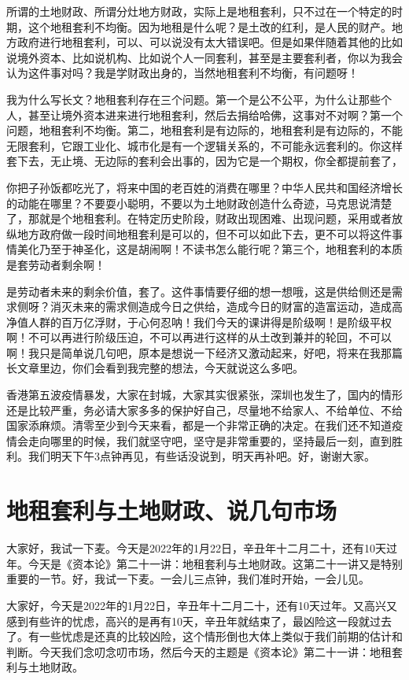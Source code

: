 \documentclass[UTF8, 12pt, a4paper]{ctexrep}
\begin{document}
所谓的土地财政、所谓分灶地方财政，实际上是地租套利，只不过在一个特定的时期，这个地租套利不均衡。因为地租是什么呢？是土改的红利，是人民的财产。地方政府进行地租套利，可以、可以说没有太大错误吧。但是如果伴随着其他的比如说境外资本、比如说机构、比如说个人一同套利，甚至是主要套利者，你以为我会认为这件事对吗？我是学财政出身的，当然地租套利不均衡，有问题呀！

我为什么写长文？地租套利存在三个问题。第一个是公不公平，为什么让那些个人，甚至让境外资本进来进行地租套利，然后去捐给哈佛，这事对不对啊？第一个问题，地租套利不均衡。第二，地租套利是有边际的，地租套利是有边际的，不能无限套利，它跟工业化、城市化是有一个逻辑关系的，不可能永远套利的。你这样套下去，无止境、无边际的套利会出事的，因为它是一个期权，你全都提前套了，

你把子孙饭都吃光了，将来中国的老百姓的消费在哪里？中华人民共和国经济增长的动能在哪里？不要耍小聪明，不要以为土地财政创造什么奇迹，马克思说清楚了，那就是个地租套利。在特定历史阶段，财政出现困难、出现问题，采用或者放纵地方政府做一段时间地租套利是可以的，但不可以如此下去，更不可以将这件事情美化乃至于神圣化，这是胡闹啊！不读书怎么能行呢？第三个，地租套利的本质是套劳动者剩余啊！

是劳动者未来的剩余价值，套了。这件事情要仔细的想一想哦，这是供给侧还是需求侧呀？消灭未来的需求侧造成今日之供给，造成今日的财富的造富运动，造成高净值人群的百万亿浮财，于心何忍呐！我们今天的课讲得是阶级啊！是阶级平权啊！不可以再进行阶级压迫，不可以再进行这样的从土改到兼并的轮回，不可以啊！我只是简单说几句吧，原本是想说一下经济又激动起来，好吧，将来在我那篇长文章里边，你们会看到我完整的想法，今天就说这么多吧。

香港第五波疫情暴发，大家在封城，大家其实很紧张，深圳也发生了，国内的情形还是比较严重，务必请大家多多的保护好自己，尽量地不给家人、不给单位、不给国家添麻烦。清零至少到今天来看，都是一个非常正确的决定。在我们还不知道疫情会走向哪里的时候，我们就坚守吧，坚守是非常重要的，坚持最后一刻，直到胜利。我们明天下午3点钟再见，有些话没说到，明天再补吧。好，谢谢大家。

\section{地租套利与土地财政、说几句市场}

大家好，我试一下麦。今天是2022年的1月22日，辛丑年十二月二十，还有10天过年。今天是《资本论》第二十一讲：地租套利与土地财政。这第二十一讲又是特别重要的一节。好，我试一下麦。一会儿三点钟，我们准时开始，一会儿见。

大家好，今天是2022年的1月22日，辛丑年十二月二十，还有10天过年。又高兴又感到有些许的忧虑，高兴的是再有10天，辛丑年就结束了，最凶险这一段就过去了。有一些忧虑是还真的比较凶险，这个情形倒也大体上类似于我们前期的估计和判断。今天我们念叨念叨市场，然后今天的主题是《资本论》第二十一讲：地租套利与土地财政。
\end{document}
